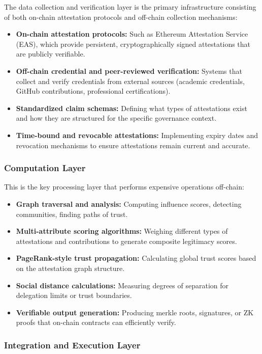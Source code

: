The data collection and verification layer is the primary infrastructure consisting of both on-chain attestation protocols and off-chain collection mechanisms:

\begin{itemize}
\item \textbf{On-chain attestation protocols:} Such as Ethereum Attestation Service (EAS), which provide persistent, cryptographically signed attestations that are publicly verifiable.
\item \textbf{Off-chain credential and peer-reviewed verification:} Systems that collect and verify credentials from external sources (academic credentials, GitHub contributions, professional certifications).
\item \textbf{Standardized claim schemas:} Defining what types of attestations exist and how they are structured for the specific governance context.
\item \textbf{Time-bound and revocable attestations:} Implementing expiry dates and revocation mechanisms to ensure attestations remain current and accurate.
\end{itemize}

\subsubsection{Computation Layer}

This is the key processing layer that performs expensive operations off-chain:

\begin{itemize}
\item \textbf{Graph traversal and analysis:} Computing influence scores, detecting communities, finding paths of trust.
\item \textbf{Multi-attribute scoring algorithms:} Weighing different types of attestations and contributions to generate composite legitimacy scores.
\item \textbf{PageRank-style trust propagation:} Calculating global trust scores based on the attestation graph structure.
\item \textbf{Social distance calculations:} Measuring degrees of separation for delegation limits or trust boundaries.
\item \textbf{Verifiable output generation:} Producing merkle roots, signatures, or ZK proofs that on-chain contracts can efficiently verify.
\end{itemize}

\subsubsection{Integration and Execution Layer}

